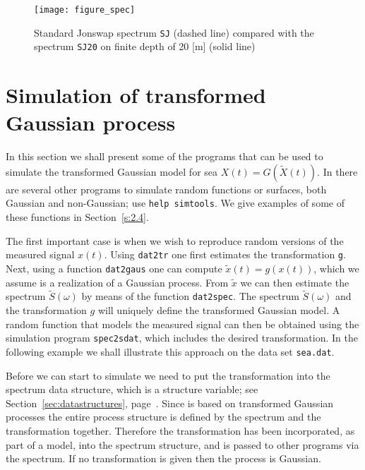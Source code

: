 \begin{figure}[hbt]
\centering
\texttt{[image: figure\_spec]}
\vspace{-3mm}
  \caption[{\sc Jonswap} spectrum compared
with spectrum on finite depth]{
Standard {\sc Jonswap} spectrum {\tt SJ} (dashed line)
compared with the spectrum {\tt SJ20} on finite depth
of 20 [m] (solid line)
}
  \label{fig4-1}
\end{figure}


\section{Simulation of transformed Gaussian
  process}\label{sec:simulationofGaussian}

In this section we shall present some of the programs that can be used to simulate 
the transformed Gaussian model for sea $X(t)=G(\widetilde X(t))$. 
In \progname{} there are several other programs to simulate random functions
or surfaces, both Gaussian and non-Gaussian; use {\tt help simtools}. 
We give examples of some of these functions in Section~\ref{s:2.4}.  

The first important case is when we wish to reproduce random versions
of the measured signal $x(t)$. Using {\tt dat2tr}
one first
estimates the transformation {\tt g}. Next, using a function
{\tt dat2gaus}
one can compute $\tilde x(t)=g(x(t))$, which we assume is a realization
of a Gaussian process. From $\tilde x$ we can then estimate
the spectrum $\tilde S(\omega)$ by means of the function
{\tt dat2spec}. The spectrum $\tilde S(\omega)$ and the transformation
$g$ will uniquely define the transformed Gaussian model. A random
function that models the measured signal can then be obtained using the
simulation program {\tt spec2sdat}, 
which includes the desired transformation.
In the following example we shall illustrate
this approach on the data set {\tt sea.dat}.

Before we can start to simulate we need to put the transformation into the
spectrum data structure, which is a \ML{} structure variable; 
see Section~\ref{sec:datastructures}, page~\pageref{sec:datastructures}. 
Since \progname{} is based on transformed Gaussian
processes the entire process structure is defined by the spectrum and
the transformation together. Therefore the transformation has been
incorporated, as part of a model, into the spectrum structure, and is
passed to other \progname{} programs via the spectrum.
If no transformation is given then the process is Gaussian.

